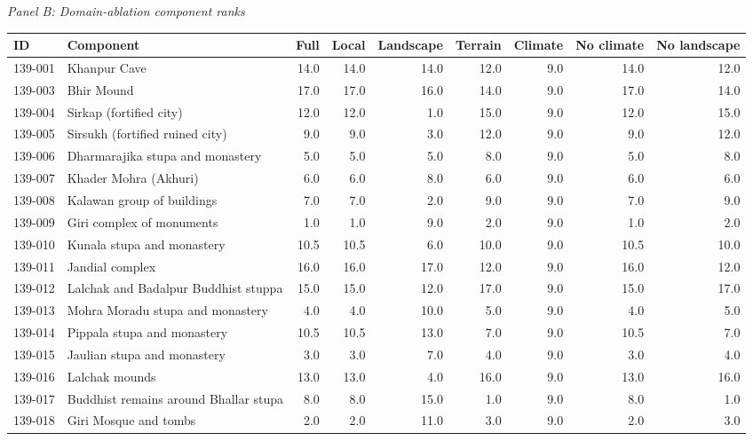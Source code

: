 \begin{landscape}
\endgroup
\par\medskip\noindent\textit{Panel B: Domain-ablation component ranks}\par
\begingroup
\tiny
\setlength{\tabcolsep}{3pt}
\begin{center}
\begin{adjustbox}{max width=\linewidth}
\begin{tabular}{p{}p{}rrrrrrr}
\toprule
ID & Component & Full & Local & Landscape & Terrain & Climate & No climate & No landscape \\
\midrule
139-001 & Khanpur Cave & 14.0 & 14.0 & 14.0 & 12.0 & 9.0 & 14.0 & 12.0 \\
139-003 & Bhir Mound & 17.0 & 17.0 & 16.0 & 14.0 & 9.0 & 17.0 & 14.0 \\
139-004 & Sirkap (fortified city) & 12.0 & 12.0 & 1.0 & 15.0 & 9.0 & 12.0 & 15.0 \\
139-005 & Sirsukh (fortified ruined city) & 9.0 & 9.0 & 3.0 & 12.0 & 9.0 & 9.0 & 12.0 \\
139-006 & Dharmarajika stupa and monastery & 5.0 & 5.0 & 5.0 & 8.0 & 9.0 & 5.0 & 8.0 \\
139-007 & Khader Mohra (Akhuri) & 6.0 & 6.0 & 8.0 & 6.0 & 9.0 & 6.0 & 6.0 \\
139-008 & Kalawan group of buildings & 7.0 & 7.0 & 2.0 & 9.0 & 9.0 & 7.0 & 9.0 \\
139-009 & Giri complex of monuments & 1.0 & 1.0 & 9.0 & 2.0 & 9.0 & 1.0 & 2.0 \\
139-010 & Kunala stupa and monastery & 10.5 & 10.5 & 6.0 & 10.0 & 9.0 & 10.5 & 10.0 \\
139-011 & Jandial complex & 16.0 & 16.0 & 17.0 & 12.0 & 9.0 & 16.0 & 12.0 \\
139-012 & Lalchak and Badalpur Buddhist stuppa & 15.0 & 15.0 & 12.0 & 17.0 & 9.0 & 15.0 & 17.0 \\
139-013 & Mohra Moradu stupa and monastery & 4.0 & 4.0 & 10.0 & 5.0 & 9.0 & 4.0 & 5.0 \\
139-014 & Pippala stupa and monastery & 10.5 & 10.5 & 13.0 & 7.0 & 9.0 & 10.5 & 7.0 \\
139-015 & Jaulian stupa and monastery & 3.0 & 3.0 & 7.0 & 4.0 & 9.0 & 3.0 & 4.0 \\
139-016 & Lalchak mounds & 13.0 & 13.0 & 4.0 & 16.0 & 9.0 & 13.0 & 16.0 \\
139-017 & Buddhist remains around Bhallar stupa & 8.0 & 8.0 & 15.0 & 1.0 & 9.0 & 8.0 & 1.0 \\
139-018 & Giri Mosque and tombs & 2.0 & 2.0 & 11.0 & 3.0 & 9.0 & 2.0 & 3.0 \\

\end{tabular}
\end{adjustbox}
\end{center}
\end{landscape}
